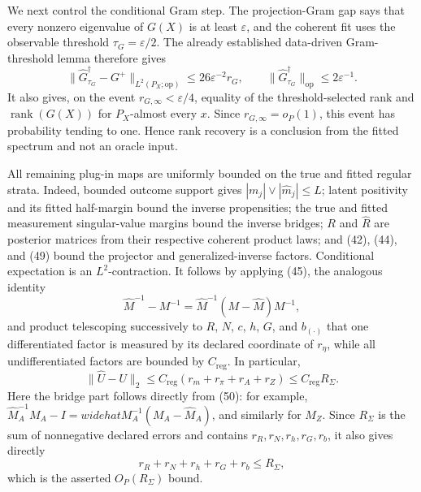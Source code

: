 We next control the conditional Gram step.  The projection-Gram gap says that every nonzero eigenvalue of \(G(X)\) is at least \(\varepsilon\), and the coherent fit uses the observable threshold \(\tau_G=\varepsilon/2\).  The already established data-driven Gram-threshold lemma therefore gives
\[
 \|\widehat G_{\tau_G}^{\dagger}-G^+\|_{L^2(P_X;\mathrm{op})}
 \leq26\varepsilon^{-2}r_G,
 \qquad
 \|\widehat G_{\tau_G}^{\dagger}\|_{\mathrm{op}}
 \leq2\varepsilon^{-1}.
 \tag{49}
\]
It also gives, on the event \(r_{G,\infty}<\varepsilon/4\), equality of the threshold-selected rank and \(\operatorname{rank}(G(X))\) for \(P_X\)-almost every \(x\).  Since \(r_{G,\infty}=o_P(1)\), this event has probability tending to one.  Hence rank recovery is a conclusion from the fitted spectrum and not an oracle input.

All remaining plug-in maps are uniformly bounded on the true and fitted regular strata.  Indeed, bounded outcome support gives \(|m_j|\vee|\widehat m_j|\leq L\); latent positivity and its fitted half-margin bound the inverse propensities; the true and fitted measurement singular-value margins bound the inverse bridges; \(R\) and \(\widehat R\) are posterior matrices from their respective coherent product laws; and (42), (44), and (49) bound the projector and generalized-inverse factors.  Conditional expectation is an \(L^2\)-contraction.  It follows by applying (45), the analogous identity
\[
 \widehat M^{-1}-M^{-1}
 =\widehat M^{-1}(M-\widehat M)M^{-1},
 \tag{50}
\]
and product telescoping successively to \(R\), \(N\), \(c\), \(h\), \(G\), and \(b_{(\cdot)}\) that one differentiated factor is measured by its declared coordinate of \(r_\eta\), while all undifferentiated factors are bounded by \(C_{\mathrm{reg}}\).  In particular,
\[
 \|\widehat U-U\|_2
 \leq C_{\mathrm{reg}}(r_m+r_\pi+r_A+r_Z)
 \leq C_{\mathrm{reg}}R_\Sigma.
 \tag{51}
\]
Here the bridge part follows directly from (50): for example,
\(\widehat M_A^{-1}M_A-I=widehat M_A^{-1}(M_A-\widehat M_A)\), and similarly for \(M_Z\).  Since \(R_\Sigma\) is the sum of nonnegative declared errors and contains \(r_R,r_N,r_h,r_G,r_b\), it also gives directly
\[
 r_R+r_N+r_h+r_G+r_b\leq R_\Sigma,
 \tag{52}
\]
which is the asserted \(O_P(R_\Sigma)\) bound.

